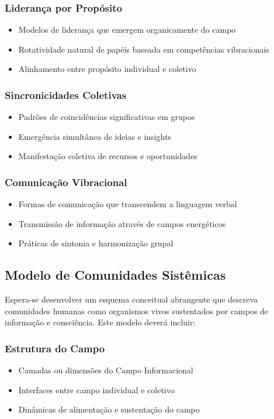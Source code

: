 \subsubsection{Liderança por Propósito}
\begin{itemize}
    \item Modelos de liderança que emergem organicamente do campo
    \item Rotatividade natural de papéis baseada em competências vibracionais
    \item Alinhamento entre propósito individual e coletivo
\end{itemize}

\subsubsection{Sincronicidades Coletivas}
\begin{itemize}
    \item Padrões de coincidências significativas em grupos
    \item Emergência simultânea de ideias e insights
    \item Manifestação coletiva de recursos e oportunidades
\end{itemize}

\subsubsection{Comunicação Vibracional}
\begin{itemize}
    \item Formas de comunicação que transcendem a linguagem verbal
    \item Transmissão de informação através de campos energéticos
    \item Práticas de sintonia e harmonização grupal
\end{itemize}

\subsection{Modelo de Comunidades Sistêmicas}

Espera-se desenvolver um esquema conceitual abrangente que descreva comunidades humanas como organismos vivos sustentados por campos de informação e consciência. Este modelo deverá incluir:

\subsubsection{Estrutura do Campo}
\begin{itemize}
    \item Camadas ou dimensões do Campo Informacional
    \item Interfaces entre campo individual e coletivo
    \item Dinâmicas de alimentação e sustentação do campo
\end{itemize}

